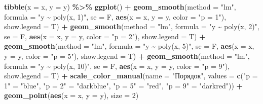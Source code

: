 \documentclass[
  11pt,
]{book}
\newenvironment{Shaded}{\begin{snugshade}}{\end{snugshade}}
\newcommand{\AttributeTok}[1]{\textcolor[rgb]{0.13,0.29,0.53}{#1}}
\newcommand{\DecValTok}[1]{\textcolor[rgb]{0.00,0.00,0.81}{#1}}
\newcommand{\FunctionTok}[1]{\textcolor[rgb]{0.13,0.29,0.53}{\textbf{#1}}}
\newcommand{\NormalTok}[1]{#1}
\newcommand{\OtherTok}[1]{\textcolor[rgb]{0.56,0.35,0.01}{#1}}
\newcommand{\SpecialCharTok}[1]{\textcolor[rgb]{0.81,0.36,0.00}{\textbf{#1}}}
\newcommand{\StringTok}[1]{\textcolor[rgb]{0.31,0.60,0.02}{#1}}
\begin{document}
\begin{Shaded}
\begin{Highlighting}[]
\FunctionTok{tibble}\NormalTok{(}\AttributeTok{x =}\NormalTok{ x, }\AttributeTok{y =}\NormalTok{ y) }\SpecialCharTok{\%\textgreater{}\%}
  \FunctionTok{ggplot}\NormalTok{() }\SpecialCharTok{+}
  \FunctionTok{geom\_smooth}\NormalTok{(}\AttributeTok{method =} \StringTok{"lm"}\NormalTok{, }\AttributeTok{formula =} \StringTok{"y \textasciitilde{} poly(x, 1)"}\NormalTok{, }\AttributeTok{se =}\NormalTok{ F,}
              \FunctionTok{aes}\NormalTok{(}\AttributeTok{x =}\NormalTok{ x, }\AttributeTok{y =}\NormalTok{ y, }\AttributeTok{color =} \StringTok{"p = 1"}\NormalTok{), }\AttributeTok{show.legend =}\NormalTok{ T) }\SpecialCharTok{+}
  \FunctionTok{geom\_smooth}\NormalTok{(}\AttributeTok{method =} \StringTok{"lm"}\NormalTok{, }\AttributeTok{formula =} \StringTok{"y \textasciitilde{} poly(x, 2)"}\NormalTok{, }\AttributeTok{se =}\NormalTok{ F, }
              \FunctionTok{aes}\NormalTok{(}\AttributeTok{x =}\NormalTok{ x, }\AttributeTok{y =}\NormalTok{ y, }\AttributeTok{color =} \StringTok{"p = 2"}\NormalTok{), }\AttributeTok{show.legend =}\NormalTok{ T) }\SpecialCharTok{+}
  \FunctionTok{geom\_smooth}\NormalTok{(}\AttributeTok{method =} \StringTok{"lm"}\NormalTok{, }\AttributeTok{formula =} \StringTok{"y \textasciitilde{} poly(x, 5)"}\NormalTok{, }\AttributeTok{se =}\NormalTok{ F, }
              \FunctionTok{aes}\NormalTok{(}\AttributeTok{x =}\NormalTok{ x, }\AttributeTok{y =}\NormalTok{ y, }\AttributeTok{color =} \StringTok{"p = 5"}\NormalTok{), }\AttributeTok{show.legend =}\NormalTok{ T) }\SpecialCharTok{+}
  \FunctionTok{geom\_smooth}\NormalTok{(}\AttributeTok{method =} \StringTok{"lm"}\NormalTok{, }\AttributeTok{formula =} \StringTok{"y \textasciitilde{} poly(x, 10)"}\NormalTok{, }\AttributeTok{se =}\NormalTok{ F, }
              \FunctionTok{aes}\NormalTok{(}\AttributeTok{x =}\NormalTok{ x, }\AttributeTok{y =}\NormalTok{ y, }\AttributeTok{color =} \StringTok{"p = 9"}\NormalTok{), }\AttributeTok{show.legend =}\NormalTok{ T) }\SpecialCharTok{+}
  \FunctionTok{scale\_color\_manual}\NormalTok{(}\AttributeTok{name =} \StringTok{"Порядок"}\NormalTok{,}
                     \AttributeTok{values =} \FunctionTok{c}\NormalTok{(}\StringTok{"p = 1"} \OtherTok{=} \StringTok{"blue"}\NormalTok{, }\StringTok{"p = 2"} \OtherTok{=} \StringTok{"darkblue"}\NormalTok{, }
                                \StringTok{"p = 5"} \OtherTok{=} \StringTok{"red"}\NormalTok{, }\StringTok{"p = 9"} \OtherTok{=} \StringTok{"darkred"}\NormalTok{)) }\SpecialCharTok{+}
  \FunctionTok{geom\_point}\NormalTok{(}\FunctionTok{aes}\NormalTok{(}\AttributeTok{x =}\NormalTok{ x, }\AttributeTok{y =}\NormalTok{ y), }\AttributeTok{size =} \DecValTok{2}\NormalTok{)}
\end{Highlighting}
\end{Shaded}
\end{document}
